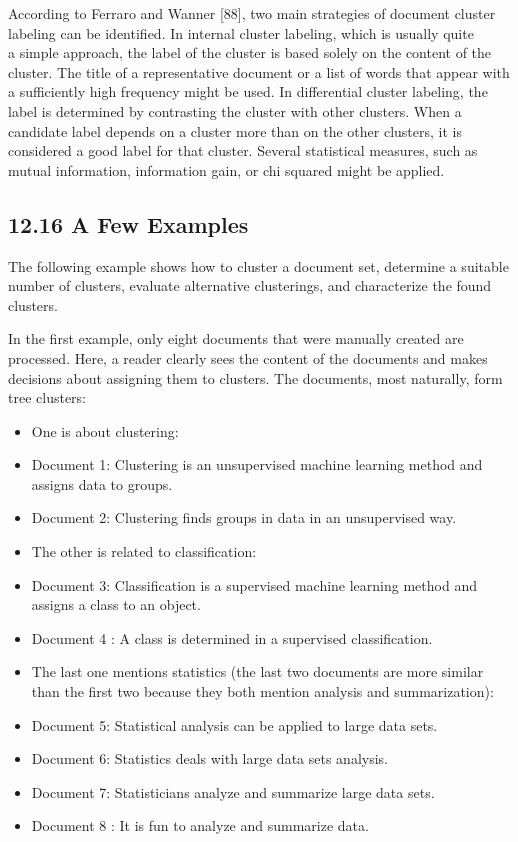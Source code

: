 \documentclass[10pt]{book}
\begin{document}
According to Ferraro and Wanner [88], two main strategies of document cluster labeling can be identified. In internal cluster labeling, which is usually quite\\
a simple approach, the label of the cluster is based solely on the content of the cluster. The title of a representative document or a list of words that appear with a sufficiently high frequency might be used. In differential cluster labeling, the label is determined by contrasting the cluster with other clusters. When a candidate label depends on a cluster more than on the other clusters, it is considered a good label for that cluster. Several statistical measures, such as mutual information, information gain, or chi squared might be applied.

\subsection*{12.16 A Few Examples}
The following example shows how to cluster a document set, determine a suitable number of clusters, evaluate alternative clusterings, and characterize the found clusters.

In the first example, only eight documents that were manually created are processed. Here, a reader clearly sees the content of the documents and makes decisions about assigning them to clusters. The documents, most naturally, form tree clusters:

\begin{itemize}
  \item One is about clustering:
  \item Document 1: Clustering is an unsupervised machine learning method and assigns data to groups.
  \item Document 2: Clustering finds groups in data in an unsupervised way.
  \item The other is related to classification:
  \item Document 3: Classification is a supervised machine learning method and assigns a class to an object.
  \item Document 4 : A class is determined in a supervised classification.
  \item The last one mentions statistics (the last two documents are more similar than the first two because they both mention analysis and summarization):
  \item Document 5: Statistical analysis can be applied to large data sets.
  \item Document 6: Statistics deals with large data sets analysis.
  \item Document 7: Statisticians analyze and summarize large data sets.
  \item Document 8 : It is fun to analyze and summarize data.
\end{itemize}
\end{document}
